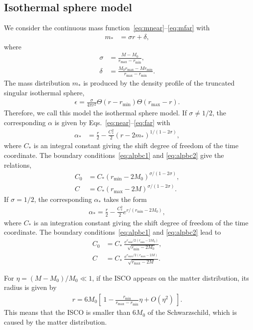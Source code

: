 \documentclass[aps,11pt,nofootinbib,preprintnumbers,groupedaddress,superscriptaddress]{revtex4-2}
\begin{document}
\subsection{Isothermal sphere model}
We consider the continuous mass function~\eqref{eq:mnear}--\eqref{eq:mfar} with
\begin{align}
m_*
&=\sigma r+ \delta,
\end{align}
where 
\begin{align}
\sigma&=\frac{M-M_0}{r_{\mathrm{max}}-r_{\mathrm{min}}},\\
\delta&=\frac{M_0 r_{\mathrm{max}}-M r_{\mathrm{min}}}{r_{\mathrm{max}}-r_{\mathrm{min}}}.
\end{align}
The mass distribution $m_*$ is produced by the density profile of the truncated singular isothermal sphere, 
\begin{align}
\epsilon=\frac{\sigma}{4\pi r^2}\Theta(r-r_{\mathrm{min}})\Theta(r_{\mathrm{max}}-r).
\end{align}
Therefore, we call this model the isothermal sphere model.
If $\sigma\neq 1/2$, the corresponding $\alpha$
is given by Eqs.~\eqref{eq:near}--\eqref{eq:far} with 
\begin{align}
\alpha_*&=\frac{r}{2}-\frac{C_*^2}{2}(r-2m_*)^{1/(1-2\sigma)},
\end{align}
where $C_*$ is an integral constant giving the shift degree of freedom of the time coordinate.
The boundary conditions~\eqref{eq:alpbc1} and \eqref{eq:alpbc2} give the relations, 
\begin{align}
C_0&=C_* (r_{\mathrm{min}}-2M_0)^{\sigma/(1-2\sigma)},
\\
C&=C_*(r_{\mathrm{max}}-2M)^{\sigma/(1-2\sigma)}.
\end{align}
If $\sigma=1/2$, the corresponding $\alpha_*$ takes the form
\begin{align}
\alpha_*=\frac{r}{2}-\frac{C_*^2}{2} e^{r/(r_{\mathrm{min}}-2M_0)},
\end{align}
where $C_*$ is an integration constant giving the shift degree of freedom of the time coordinate. 
The boundary conditions~\eqref{eq:alpbc1} and \eqref{eq:alpbc2} lead to 
\begin{align}
C_0&=C_*\:\! \frac{e^{r_{\mathrm{min}}/2(r_{\mathrm{min}}-2M_0)}}{\sqrt{r_{\mathrm{min}}-2M_0}},
\\
C
&=C_*\:\!\frac{e^{r_{\mathrm{max}}/2(r_{\mathrm{max}}-2M)}}{\sqrt{r_{\mathrm{max}}-2M}}. 
\end{align}

For 
$\eta=(M-M_0)/M_0\ll1$, 
if the ISCO appears on the matter distribution, its radius is given by
\begin{align}
r=6 M_0 \left[\:\!
1 -\frac{r_{\mathrm{min}}}{r_{\mathrm{max}}-r_{\mathrm{min}}}
\eta
+O\left(\eta^2\right)
 \:\!\right].
\end{align}
This means that the ISCO is smaller than $6M_0$ of the Schwarzschild, which is caused by the matter distribution.
\end{document}
